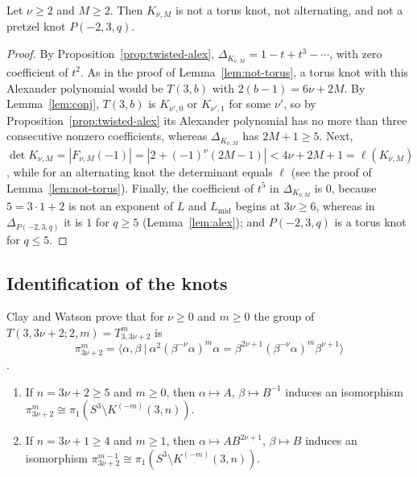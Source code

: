 \begin{lemma}\label{lem:twisted-not-torus}
Let $\nu\ge2$ and $M\ge2$. Then $K_{\nu,M}$ is not a torus knot, not alternating, and not a pretzel knot
$P(-2,3,q)$.
\end{lemma}

\begin{proof}
By Proposition~\ref{prop:twisted-alex}, $\Delta_{K_{\nu,M}}=1-t+t^3-\cdots$, with zero coefficient of $t^2$. As in
the proof of Lemma~\ref{lem:not-torus}, a torus knot with this Alexander polynomial would be $T(3,b)$ with
$2(b-1)=6\nu+2M$. By Lemma~\ref{lem:conj}, $T(3,b)$ is $K_{\nu',0}$ or $K_{\nu',1}$ for some $\nu'$, so by
Proposition~\ref{prop:twisted-alex} its Alexander polynomial has no more than three consecutive nonzero
coefficients, whereas $\Delta_{K_{\nu,M}}$ has $2M+1\ge5$. Next,
$\det K_{\nu,M}=|F_{\nu,M}(-1)|=|2+(-1)^\nu(2M-1)|<4\nu+2M+1=\ell(K_{\nu,M})$, while for an alternating knot the
determinant equals $\ell$ (see the proof of Lemma~\ref{lem:not-torus}). Finally, the coefficient of $t^5$ in
$\Delta_{K_{\nu,M}}$ is $0$, because $5=3\cdot1+2$ is not an exponent of $L$ and $L_{\mathrm{mid}}$ begins at
$3\nu\ge6$, whereas in $\Delta_{P(-2,3,q)}$ it is $1$ for $q\ge5$ (Lemma~\ref{lem:alex}); and $P(-2,3,q)$ is a torus
knot for $q\le5$.
\end{proof}

\subsection{Identification of the knots}\label{ss:twisted-top}
Clay and Watson prove that for $\nu\ge0$ and $m\ge0$ the group of $T(3,3\nu+2;2,m)=T^m_{3,3\nu+2}$ is
\[
\pi^m_{3\nu+2}=\bigl\langle\alpha,\beta\ \big|\ \alpha^2(\beta^{-\nu}\alpha)^m\alpha=\beta^{2\nu+1}(\beta^{-\nu}\alpha)^m\beta^{\nu+1}\bigr\rangle
\]
\cite[\S3.2 and Prop.~22]{ClayWatson}.

\begin{lemma}\label{lem:twisted-group}
\begin{enumerate}
\item[(a)] If $n=3\nu+2\ge5$ and $m\ge0$, then $\alpha\mapsto A$, $\beta\mapsto B^{-1}$ induces an isomorphism
$\pi^m_{3\nu+2}\cong\pi_1(S^3\setminus K^{(-m)}(3,n))$.
\item[(b)] If $n=3\nu+1\ge4$ and $m\ge1$, then $\alpha\mapsto AB^{2\nu+1}$, $\beta\mapsto B$ induces an isomorphism
$\pi^{m-1}_{3\nu+2}\cong\pi_1(S^3\setminus K^{(-m)}(3,n))$.
\end{enumerate}
\end{lemma}

